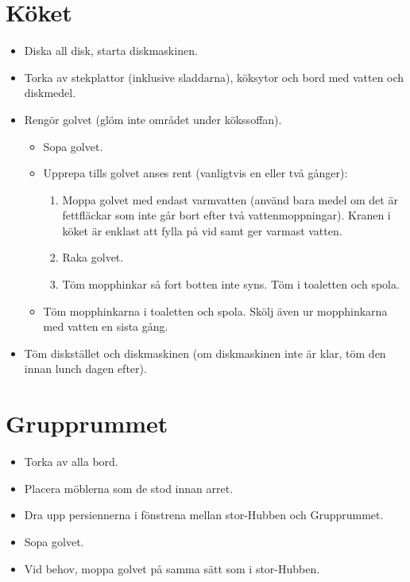 \section{Köket}
\begin{itemize}
    \item Diska all disk, starta diskmaskinen.
    \item Torka av stekplattor (inklusive sladdarna), köksytor och bord med vatten och diskmedel.
    \item Rengör golvet (glöm inte området under kökssoffan).
    \begin{itemize}
        \item Sopa golvet.
        \item Upprepa tills golvet anses rent (vanligtvis en eller två gånger):
        \begin{enumerate}
            \item Moppa golvet med endast varmvatten (använd bara medel om det är fettfläckar som inte går bort efter två vattenmoppningar). Kranen i köket är enklast att fylla på vid samt ger varmast vatten.
            \item Raka golvet.
            \item Töm mopphinkar så fort botten inte syns. Töm i toaletten och spola.
        \end{enumerate}
        \item Töm mopphinkarna i toaletten och spola. Skölj även ur mopphinkarna med vatten en sista gång.
    \end{itemize}
    \item Töm diskstället och diskmaskinen (om diskmaskinen inte är klar, töm den innan lunch dagen efter).
\end{itemize}

\section{Grupprummet}
\begin{itemize}
    \item Torka av alla bord.
    \item Placera möblerna som de stod innan arret.
    \item Dra upp persiennerna i fönstrena mellan stor-Hubben och Grupprummet.
    \item Sopa golvet.
    \item Vid behov, moppa golvet på samma sätt som i stor-Hubben.
\end{itemize}

